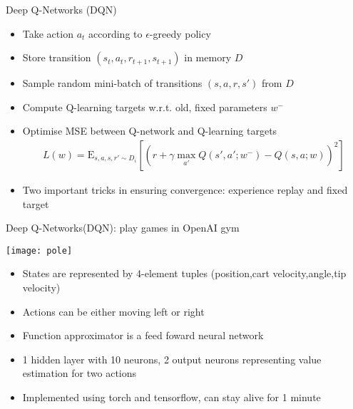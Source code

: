 \begin{frame}{Deep Q-Networks (DQN)}
    \begin{itemize}
        \item Take action $a_t$ according to $\epsilon$-greedy policy
        \item Store transition $(s_t,a_t,r_{t+1},s_{t+1})$ in memory $D$
        \item Sample random mini-batch of transitions $(s,a,r,s')$ from $D$
        \item Compute Q-learning targets w.r.t. old, fixed parameters $w^-$
        \item Optimise MSE between Q-network and Q-learning targets
            \begin{align}
                \label{eq:2}
                L(w) = \mathrm{E}_{s,a,s,r' \sim D_i}[(r+\gamma \max_{a'} Q(s',a';w^-)-Q(s,a;w))^2]
            \end{align}
        \item Two important tricks in ensuring convergence: experience replay and fixed target

    \end{itemize}
\end{frame}


\begin{frame}{Deep Q-Networks(DQN): play games in OpenAI gym}
    \begin{center}\texttt{[image: pole]}\end{center}
    \begin{itemize}
        \item States are represented by 4-element tuples (position,cart velocity,angle,tip velocity)
        \item Actions can be either moving left or right
        \item Function approximator is a feed foward neural network 
        \item 1 hidden layer with 10 neurons, 2 output neurons representing value estimation for two actions
        \item Implemented using torch and tensorflow, can stay alive for 1 minute
    \end{itemize}

\end{frame}

